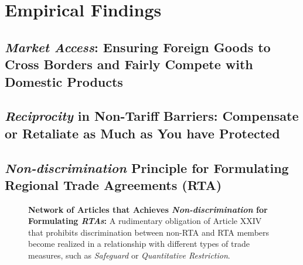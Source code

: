 \documentclass[12pt,letterpaper]{article}
\begin{document}
\section{Empirical Findings}\label{ef} %


\subsection{\textit{Market Access}: Ensuring Foreign Goods to Cross Borders and Fairly Compete with Domestic Products}\label{emp:ma}




\subsection{\textit{Reciprocity} in Non-Tariff Barriers: Compensate or Retaliate as Much as You have Protected}



\subsection{\textit{Non-discrimination} Principle for Formulating Regional Trade Agreements (RTA)}  %

\begin{figure}[ht]
  \centering{
    
  }
  \caption{{\bf Network of Articles that Achieves \textit{Non-discrimination} for Formulating \textit{RTAs}:}
    A rudimentary obligation of Article XXIV that prohibits discrimination between non-RTA and RTA members become realized in a relationship with
    different types of trade measures, such as \textit{Safeguard} or \textit{Quantitative Restriction}.
  }
  \label{fig:rta-explained}
\end{figure}
\end{document}
